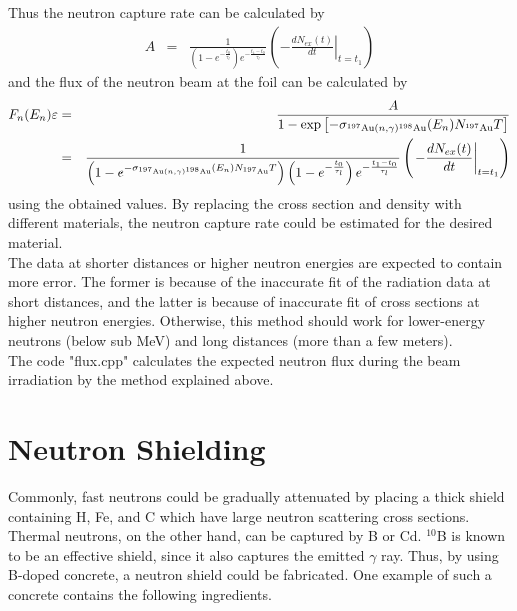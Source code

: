 \documentclass{article}
\begin{document}
Thus the neutron capture rate can be calculated by
\begin{eqnarray*}
A & = & \frac{1}{\left( 1-e^{-\frac{t_0}{\tau_l}} \right) e^{-\frac{t_1-t_0}{\tau_l}}} \left( \left. -\frac{dN_{ex}(t)}{dt}\right|_{t=t_1} \right)
\end{eqnarray*}
and the flux of the neutron beam at the foil can be calculated by
\begin{eqnarray*}
F_n (E_n) \varepsilon & = & \frac{A}{1 - \exp{\left[ -\sigma_{^{197}{\rm Au}(n,\gamma)^{198}{\rm Au}}(E_n)N_{^{197}{\rm Au}}T \right]} } \\
& = & \frac{1}{\left( 1-e^{-\sigma_{^{197}{\rm Au}(n,\gamma)^{198}{\rm Au}}(E_n)N_{^{197}{\rm Au}}T} \right) \left( 1-e^{-\frac{t_0}{\tau_l}} \right) e^{-\frac{t_1-t_0}{\tau_l}} } \left( \left. -\frac{dN_{ex}(t)}{dt}\right|_{t=t_1} \right)
\end{eqnarray*}
using the obtained values. By replacing the cross section and density with different materials, the neutron capture rate could be estimated for the desired material. \\

The data at shorter distances or higher neutron energies are expected to contain more error. The former is because of the inaccurate fit of the radiation data at short distances, and the latter is because of inaccurate fit of cross sections at higher neutron energies. Otherwise, this method should work for lower-energy neutrons (below sub MeV) and long distances (more than a few meters). \\

The code "flux.cpp" calculates the expected neutron flux during the beam irradiation by the method explained above. \\


\section{Neutron Shielding}

Commonly, fast neutrons could be gradually attenuated by placing a thick shield containing H, Fe, and C which have large neutron scattering cross sections. Thermal neutrons, on the other hand, can be captured by B or Cd. $^{10}$B is known to be an effective shield, since it also captures the emitted $\gamma$ ray. Thus, by using B-doped concrete, a neutron shield could be fabricated. One example of such a concrete contains the following ingredients.
\end{document}

